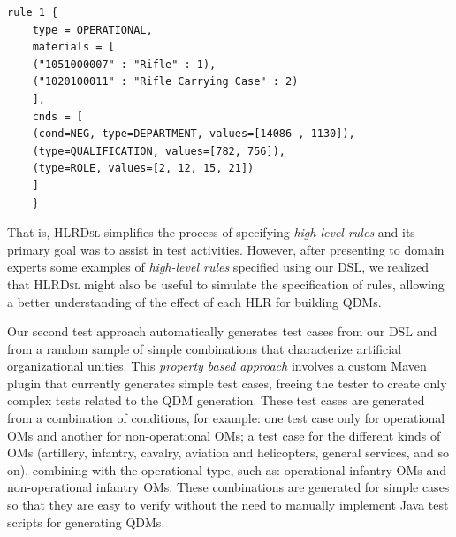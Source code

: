 \documentclass{bmcart}
\newcommand{\callers}{\emph{high-level rules}\xspace}
\newcommand{\shc}{HLR\xspace}
\newcommand{\hlrdsl}{\textsc{HLRDsl}\xspace}
\begin{document}
\begin{small}
	\begin{lstlisting}[frame=single, language=DSL, caption={\it Example of a \shc declaration using our DSL}, label={code:dslExample}]
	rule 1 { 
	type = OPERATIONAL, 
	materials = [ 
	("1051000007" : "Rifle" : 1), 
	("1020100011" : "Rifle Carrying Case" : 2)
	], 
	cnds = [ 
	(cond=NEG, type=DEPARTMENT, values=[14086 , 1130]),
	(type=QUALIFICATION, values=[782, 756]), 
	(type=ROLE, values=[2, 12, 15, 21])
	]
	}
	\end{lstlisting}
\end{small}


That is, \hlrdsl simplifies the process of specifying \callers and its primary goal was to assist in test activities. However, after presenting to domain experts some examples of \callers specified using our DSL, we realized that \hlrdsl might also be useful to simulate the specification of rules, allowing a better understanding of the effect of each \shc for building QDMs.




Our second test approach automatically generates test cases from our DSL and from a random sample of simple combinations that characterize artificial organizational unities. This \emph{property based approach} involves a custom Maven plugin that currently generates simple test cases, freeing the tester to create only complex tests related to the QDM generation. These test cases are generated from a combination of conditions, for example: one test case only for operational OMs and another for non-operational OMs; a test case for the different kinds of OMs (artillery, infantry, cavalry, aviation and helicopters, general services, and so on), combining with the operational type, such as: operational infantry OMs and non-operational infantry OMs. These combinations are generated for simple cases so that they are easy to verify without the need to manually implement Java test scripts for generating QDMs. 

\end{document}
